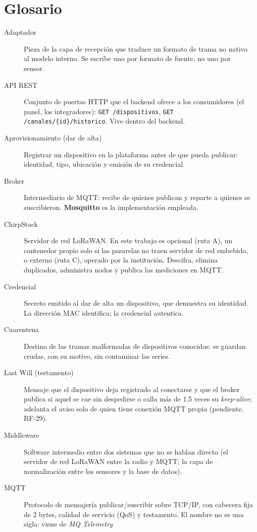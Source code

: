 \chapter*{Glosario}

\begin{description}
\item[Adaptador] Pieza de la capa de recepción que traduce un formato de trama no nativo al modelo
interno. Se escribe uno por formato de fuente, no uno por sensor.
\item[API REST] Conjunto de puertas HTTP que el backend ofrece a los consumidores (el panel, los
integradores): \texttt{GET /dispositivos}, \texttt{GET /canales/\{id\}/historico}. Vive dentro del backend.
\item[Aprovisionamiento (dar de alta)] Registrar un dispositivo en la plataforma antes de que pueda
publicar: identidad, tipo, ubicación y emisión de su credencial.
\item[Broker] Intermediario de MQTT: recibe de quienes publican y reparte a quienes se suscribieron.
\textbf{Mosquitto} es la implementación empleada.
\item[ChirpStack] Servidor de red LoRaWAN. En este trabajo es opcional (ruta A), un contenedor propio
solo si las pasarelas no traen servidor de red embebido, o externo (ruta C), operado por la institución. Descifra, elimina duplicados, administra nodos
y publica las mediciones en MQTT.
\item[Credencial] Secreto emitido al dar de alta un dispositivo, que demuestra su identidad. La
dirección MAC identifica; la credencial autentica.
\item[Cuarentena] Destino de las tramas malformadas de dispositivos conocidos: se guardan crudas,
con su motivo, sin contaminar las series.
\item[Last Will (testamento)] Mensaje que el dispositivo deja registrado al conectarse y que el
broker publica si aquel se cae sin despedirse o calla más de 1,5 veces su \emph{keep-alive}; adelanta el aviso solo de
quien tiene conexión MQTT propia (pendiente, RF-29).
\item[Middleware] Software intermedio entre dos sistemas que no se hablan directo (el servidor de red
LoRaWAN entre la radio y MQTT; la capa de normalización entre los sensores y la base de datos).
\item[MQTT] Protocolo de mensajería publicar/suscribir sobre TCP/IP, con cabecera fija de 2 bytes,
calidad de servicio (QoS) y testamento. El nombre no es una sigla: viene de \emph{MQ Telemetry
}
\end{description}
